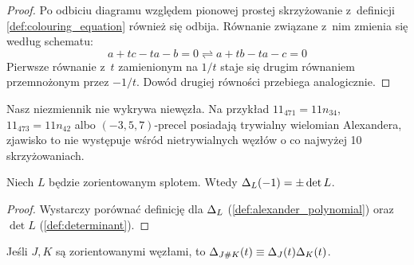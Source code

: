 \begin{proof}
    Po odbiciu diagramu względem pionowej prostej skrzyżowanie z~definicji \ref{def:colouring_equation} również się odbija.
    Równanie związane z~nim zmienia się według schematu:
    \begin{equation}
        a + tc - ta - b = 0 \rightleftharpoons a + tb - ta - c = 0
    \end{equation}
    Pierwsze równanie z~$t$ zamienionym na $1/t$ staje się drugim równaniem przemnożonym przez $-1/t$.
    Dowód drugiej równości przebiega analogicznie.
\end{proof}

Nasz niezmiennik nie wykrywa niewęzła.
Na przykład $11_{471} = 11n_{34}$, $11_{473} = 11n_{42}$ albo $(-3, 5, 7)$-precel posiadają trywialny wielomian Alexandera, zjawisko to nie występuje wśród nietrywialnych węzłów o co najwyżej 10 skrzyżowaniach.

\begin{proposition}
    \label{prp:alexander_determinant}
    Niech $L$ będzie zorientowanym splotem.
    Wtedy $\Delta_L(-1) = \pm \det L$.
\end{proposition}

\begin{proof}
    Wystarczy porównać definicję dla $\Delta_L$ (\ref{def:alexander_polynomial}) oraz $\det L$ (\ref{def:determinant}).
\end{proof}

\begin{proposition}
    \label{prp:alexander_multiplicative}
    Jeśli $J, K$ są zorientowanymi węzłami, to $\Delta_{J \mathbin{\#} K}(t) \equiv \Delta_J(t) \Delta_K(t)$.
\end{proposition}

